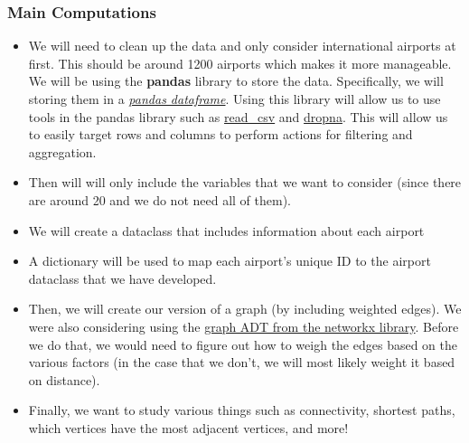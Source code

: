 \documentclass[fontsize=11pt]{article}
\begin{document}
    \subsubsection{Main Computations}
        \begin{itemize}
            \item We will need to clean up the data and only consider international airports at first. This should be around 1200 airports which makes it more manageable. We will be using the \textbf{pandas} library to store the data. Specifically, we will storing them in a \href{https://pandas.pydata.org/docs/reference/api/pandas.DataFrame.html}{\textit{pandas dataframe}}. Using this library will allow us to use tools in the pandas library such as \href{https://pandas.pydata.org/docs/reference/api/pandas.read_csv.html#pandas.read_csv}{read\_csv} and \href{https://pandas.pydata.org/docs/reference/api/pandas.DataFrame.dropna.html}{dropna}. This will allow us to easily target rows and columns to perform actions for filtering and aggregation.
            \item Then will will only include the variables that we want to consider (since there are around 20 and we do not need all of them).
            \item We will create a dataclass that includes information about each airport
            \item A dictionary will be used to map each airport's unique ID to the airport dataclass that we have developed.
            \item Then, we will create our version of a graph (by including weighted edges). We were also considering using the \href{https://networkx.org/documentation/stable/reference/introduction.html#graphs}{graph ADT from the networkx library}. Before we do that, we would need to figure out how to weigh the edges based on the various factors (in the case that we don't, we will most likely weight it based on distance).
            \item Finally, we want to study various things such as connectivity, shortest paths, which vertices have the most adjacent vertices, and more!
        \end{itemize}
\end{document}
